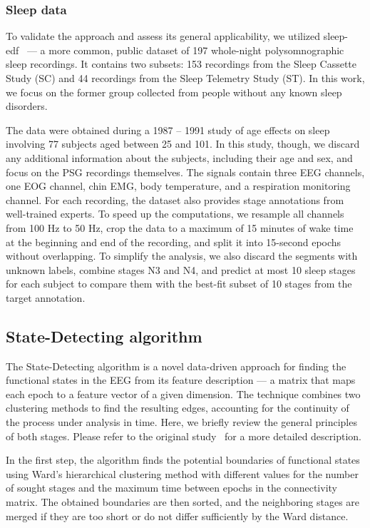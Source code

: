 \documentclass[pdflatex,sn-basic,Numbered]{sn-jnl}
\begin{document}
\subsubsection{Sleep data}

To validate the approach and assess its general applicability, we utilized sleep-edf~\cite{SleepEdf,PhysioNet} --- a more common, public dataset of 197 whole-night polysomnographic sleep recordings. It contains two subsets: 153 recordings from the Sleep Cassette Study (SC) and 44 recordings from the Sleep Telemetry Study (ST). In this work, we focus on the former group collected from people without any known sleep disorders.

The data were obtained during a 1987 -- 1991 study of age effects on sleep involving 77 subjects aged between 25 and 101. In this study, though, we discard any additional information about the subjects, including their age and sex, and focus on the PSG recordings themselves. The signals contain three EEG channels, one EOG channel, chin EMG, body temperature, and a respiration monitoring channel. For each recording, the dataset also provides stage annotations from well-trained experts. To speed up the computations, we resample all channels from 100 Hz to 50 Hz, crop the data to a maximum of 15 minutes of wake time at the beginning and end of the recording, and split it into 15-second epochs without overlapping. To simplify the analysis, we also discard the segments with unknown labels, combine stages N3 and N4, and predict at most 10 sleep stages for each subject to compare them with the best-fit subset of 10 stages from the target annotation.


\subsection{State-Detecting algorithm}

The State-Detecting algorithm is a novel data-driven approach for finding the functional states in the EEG from its feature description --- a matrix that maps each epoch to a feature vector of a given dimension. The technique combines two clustering methods to find the resulting edges, accounting for the continuity of the process under analysis in time. Here, we briefly review the general principles of both stages. Please refer to the original study~\cite{SDA} for a more detailed description.

In the first step, the algorithm finds the potential boundaries of functional states using Ward's hierarchical clustering method with different values for the number of sought stages and the maximum time between epochs in the connectivity matrix. The obtained boundaries are then sorted, and the neighboring stages are merged if they are too short or do not differ sufficiently by the Ward distance.
\end{document}
